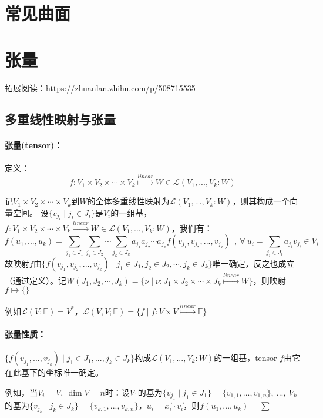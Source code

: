 \documentclass[zihao=-4,UTF8]{report}
\def\F{\mathbb{F}}
\theoremstyle{mystyle} %
\begin{document}
\chapter{常见曲面}
\chapter{张量}

拓展阅读：https://zhuanlan.zhihu.com/p/508715535

\section{多重线性映射与张量}

\subsubsection{张量(tensor)：}
定义：\begin{equation*}
    f:V_1\times V_2\times \cdots \times V_k \overset{linear}{\longmapsto }W \in \mathscr{L}(V_1,...,V_k:W)
\end{equation*}  
{\par\color{gray}\small
记$V_1\times V_2\times \cdots \times V_k$到$W$的全体多重线性映射为$\mathscr{L}(V_1,...,V_k:W)$，则其构成一个向量空间。 设$\{v_{j_i}\mid j_i \in J_i\}$是$V_i$的一组基，$f:V_1\times V_2\times \cdots \times V_k \overset{linear}{\longmapsto }W \in \mathscr{L}(V_1,...,V_k:W)$，我们有：
\begin{equation*}
    f(u_1,...,u_k)=\sum_{j_1\in J_1}\sum_{j_2\in J_2}\cdots \sum_{j_k\in J_k}a_{j_1}a_{j_2}\cdots a_{j_k}f(v_{j_1},v_{j_2},...,v_{j_k})\ \ ,\   \forall\  u_i=\sum_{j_i \in J_i}a_{j_i}v_{j_i}\in V_i
\end{equation*}
故映射$f$由$\{f(v_{j_1},v_{j_2},...,v_{j_k})\mid j_1\in J_1,j_2\in J_2,\cdots,j_k\in J_k\}$唯一确定，反之也成立（通过定义）。记$W(J_1,J_2,\cdots,J_k) = \{\nu \mid \nu: J_1\times J_2\times \cdots \times J_k \overset{linear}{\longmapsto} W\}$，则映射$f\longmapsto \{\}$
\par}
{\par\color{gray}\small
例如$\mathscr{L}(V;\F)=V^*$，$\mathscr{L}(V,V;\F) = \{f\mid f:V \times V \overset{linear}{\longmapsto} \F\}$
\par}

\subsubsection{张量性质：}
\par{} $\{f(v_{j_1},...,v_{j_k})\mid j_1 \in J_1,...,j_k \in J_k\}$构成$\mathscr{L}(V_1,...,V_k:W)$的一组基，tensor
 $f$由它在此基下的坐标唯一确定。 \par
{\par\color{gray}\small
例如，当$V_i=V,\ \dim V=n$时：设$V_1$的基为$\{v_{j_1}\mid j_1 \in J_1\}=\{v_{1,1},...,v_{1,n} \},\ ...,\ V_k$的基为$\{v_{j_k}\mid j_k \in J_k\}=\{v_{k,1},...,v_{k,n} \}$，$u_i=\vec{x_i}\cdot\vec{v_i}$，则$f(u_1,...,u_k)=\sum $
\par}
\end{document}
